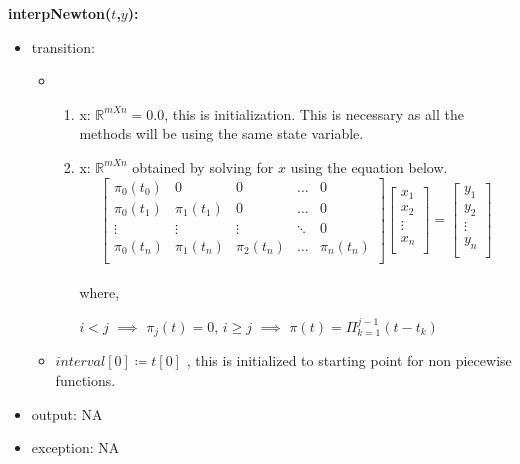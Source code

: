 \documentclass[12pt, titlepage]{article}
\begin{document}
\noindent \textbf{interpNewton($t$,$y$):}
\begin{itemize}
	\item transition: 
	\begin{itemize}
		\item 
		\begin{enumerate}
			\item x: $\mathbb{R}^{m X n} = 0.0 $, this is initialization. 
			This is necessary as all the methods will be using the same state 
			variable.
			
			\item x: $\mathbb{R}^{m X n}$ obtained by solving for $x$ using 
			the equation below.
			\begin{equation*}
			\begin{bmatrix}
			\pi_0 (t_0) & 0           & 0            & \dots         & 0 \\
			\pi_0 (t_1) & \pi_1 (t_1) & 0            & \dots         & 0 \\
			\vdots      & \vdots      & \vdots       &\ddots         & 0 \\
			\pi_0 (t_n) & \pi_1 (t_n) & \pi_2 (t_n)  & \dots         & \pi_n 
			(t_n) \\
			\end{bmatrix}
			\begin{bmatrix}
			x_1  \\
			x_2 \\
			\vdots \\
			x_n \\
			\end{bmatrix} = 
			\begin{bmatrix}
			y_1  \\
			y_2 \\
			\vdots \\
			y_n \\
			\end{bmatrix} 
			\end{equation*}\\ 
			
			where,
			
			$i < j$ $\implies$ $\pi_j (t) = 0$, 
			$i \geq j$  $\implies$  $\pi(t) = \Pi_{k=1}^{j-1} (t - t_k)$  
			
		\end{enumerate}
		\item $interval[0] \coloneqq t[0] $ , this is initialized to 
		starting point for non piecewise functions.
	\end{itemize}	
	\item output: NA	
\item exception: NA
\end{itemize}
\end{document}
